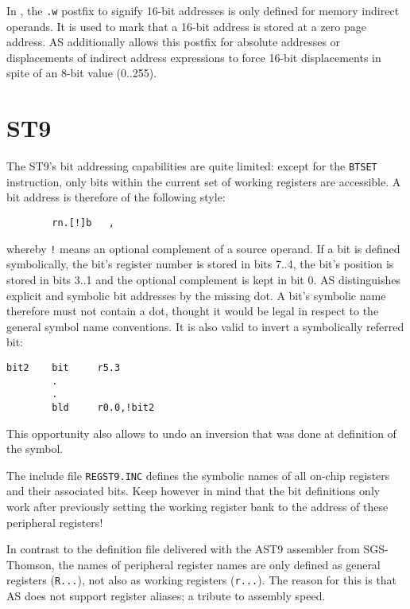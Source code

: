\documentclass[12pt,twoside]{report}
\newcommand{\tty}[1]{{\tt #1}}
\newcommand{\asname}{{AS}}
\begin{document}
In \cite{ST7Man}, the \tty{.w} postfix to signify 16-bit addresses is only
defined for memory indirect operands.  It is used to mark that a
16-bit address is stored at a zero page address.  \asname{} additionally
allows this postfix for absolute addresses or displacements of
indirect address expressions to force 16-bit displacements in spite
of an 8-bit value (0..255).


\section{ST9}

The ST9's bit addressing capabilities are quite limited: except for
the \tty{BTSET} instruction, only bits within the current set of working
registers are accessible.  A bit address is therefore of the
following style:
\begin{verbatim}
        rn.[!]b   ,
\end{verbatim}
whereby \tty{!} means an optional complement of a source operand.  If a bit
is defined symbolically, the bit's register number is stored in bits
7..4, the bit's position is stored in bits 3..1 and the optional
complement is kept in bit 0.  \asname{} distinguishes explicit and symbolic
bit addresses by the missing dot.  A bit's symbolic name therefore
must not contain a dot, thought it would be legal in respect to the
general symbol name conventions.  It is also valid to invert a
symbolically referred bit:
\begin{verbatim}
bit2    bit     r5.3
        .
        .
        bld     r0.0,!bit2
\end{verbatim}
This opportunity also allows to undo an inversion that was done at
definition of the symbol.

The include file \tty{REGST9.INC} defines the symbolic names of all on-chip
registers and their associated bits. Keep however in mind that the
bit definitions only work after previously setting the working
register bank to the address of these peripheral registers!

In contrast to the definition file delivered with the AST9 assembler
from SGS-Thomson, the names of peripheral register names are only
defined as general registers (\tty{R...}), not also as working registers
(\tty{r...}).  The reason for this is that \asname{} does not support register
aliases; a tribute to assembly speed.

\end{document}
